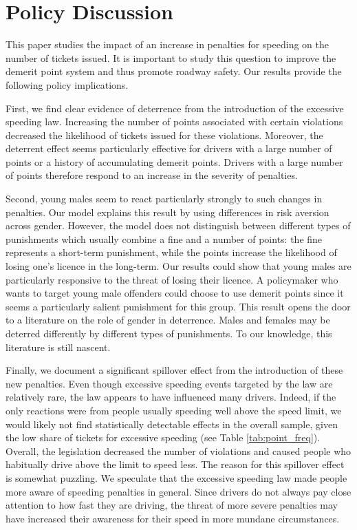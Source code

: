 \section{Policy Discussion}
\label{sec:Discussion}

This paper studies the impact of an increase in penalties for speeding 
on the number of tickets issued. 
It is important to study this question to improve the demerit point system 
and thus promote roadway safety. 
Our results provide the following policy implications.

First, we find clear evidence of deterrence from the introduction of the excessive speeding law. 
Increasing the number of points associated with certain violations 
decreased the likelihood of tickets issued for these violations. Moreover, the deterrent effect seems particularly effective for drivers with a large number of points or a history of accumulating demerit points. 
Drivers with a large number of points therefore respond to an increase in the severity of penalties.

Second, young males seem to react particularly strongly to such changes in penalties. 
Our model explains this result by using differences in risk aversion across gender. 
However, the model does not distinguish between different types of punishments 
which usually combine a fine and a number of points: 
the fine represents a short-term punishment, 
while the points increase the likelihood of losing one’s licence in the long-term. 
Our results could show that young males are particularly responsive 
to the threat of losing their licence. 
A policymaker who wants to target young male offenders could choose to use demerit points 
since it seems a particularly salient punishment for this group. 
This result opens the door to a literature on the role of gender in deterrence. 
Males and females may be deterred differently by different types of punishments. 
To our knowledge, this literature is still nascent.

Finally, we document a significant spillover effect 
from the introduction of these new penalties. 
Even though excessive speeding events targeted by the law are relatively rare, 
the law appears to have influenced many drivers. 
Indeed, if the only reactions were from people usually speeding well above the speed limit, 
we would likely not find statistically detectable effects in the overall sample, 
given the low share of tickets for excessive speeding 
(see Table \ref{tab:point_freq}). 
Overall, the legislation decreased the number of violations 
and caused people who habitually drive above the limit to speed less. 
The reason for this spillover effect is somewhat puzzling. 
We speculate that the excessive speeding law made people more aware of speeding penalties in general. 
Since drivers do not always pay close attention to how fast they are driving, 
the threat of more severe penalties may have increased their 
awareness for their speed in more mundane circumstances.



